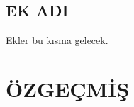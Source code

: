 \documentclass[a4paper,12pt]{report}
\begin{document}
\begin{singlespacing}
{}

\end{singlespacing}

\begin{appendices}
\chapter{EK ADI}
\label{app:metrics}
\onehalfspacing

Ekler bu kısma gelecek.

\end{appendices}

\chapter*{ÖZGEÇMİŞ}
\end{document}
